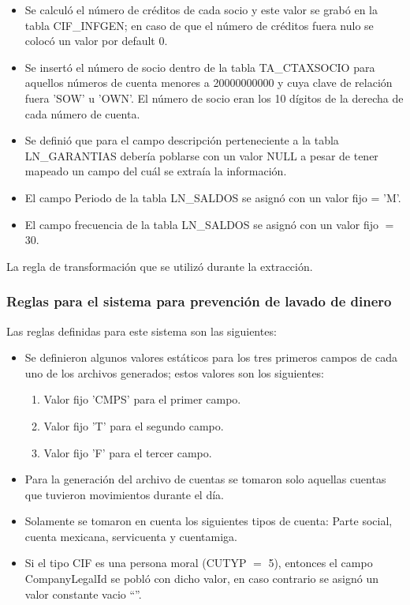 \begin{itemize}
\item Se calculó el número de créditos de cada socio y este valor se grabó en
  la tabla CIF\_INFGEN; en caso de que el número de créditos fuera nulo se
  colocó un valor por default 0.

\item Se insertó el número de socio dentro de la tabla TA\_CTAXSOCIO para
  aquellos números de cuenta menores a 20000000000 y cuya clave de relación
  fuera 'SOW' u 'OWN'. El número de socio eran los 10 dígitos de la derecha de
  cada número de cuenta.

\item Se definió que para el campo descripción perteneciente a la tabla
  LN\_GARANTIAS debería poblarse con un valor NULL a pesar de tener mapeado un
  campo del cuál se extraía la información.

\item El campo Periodo de la tabla LN\_SALDOS se asignó con un valor fijo =
  'M'.

\item El campo frecuencia de la tabla LN\_SALDOS se asignó con un valor fijo
  $=$ 30.

\end{itemize}

La regla de transformación que se utilizó durante la extracción.

\subsubsection{Reglas para el sistema para prevención de lavado de dinero}

Las reglas definidas para este sistema son las siguientes:

\begin{itemize}
\item Se definieron algunos valores estáticos para los tres primeros campos de
  cada uno de los archivos generados; estos valores son los siguientes:
\begin{enumerate}
\item Valor fijo 'CMPS' para el primer campo.
\item Valor fijo 'T' para el segundo campo.
\item Valor fijo 'F' para el tercer campo.
\end{enumerate}
\item Para la generación del archivo de cuentas se tomaron solo aquellas
  cuentas que tuvieron movimientos durante el día.
\item Solamente se tomaron en cuenta los siguientes tipos de cuenta: Parte
  social, cuenta mexicana, servicuenta y cuentamiga.
\item Si el tipo CIF es una persona moral (CUTYP $=$ 5), entonces el campo
  CompanyLegalId se pobló con dicho valor, en caso contrario se asignó un valor
  constante vacio ``''.
\end{itemize}


